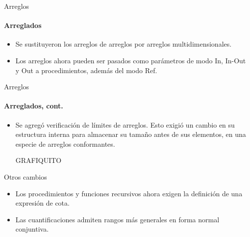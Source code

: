 \begin{frame}{Arreglos}
\framesubtitle{Arreglados}
\begin{itemize}
  \item Se sustituyeron los arreglos de arreglos por arreglos multidimensionales. \multidim{}

  \item Los arreglos ahora pueden ser pasados como parámetros de modo In, In-Out y Out a procedimientos, además del modo Ref. \inoutarr{}

\end{itemize}
\end{frame}
\begin{frame}{Arreglos}
\framesubtitle{Arreglados, cont.}
\begin{itemize}

  \item Se agregó verificación de límites de arreglos. \limits{} Esto exigió un
  cambio en su estructura interna para almacenar su tamaño antes de sus elementos, en una especie de arreglos conformantes.

  GRAFIQUITO

\end{itemize}
\end{frame}


\cnfquant{
\begin{lstlisting}[language=graciela, style=code, escapechar=\~]
(% ~\qop~ i : int | 0 < i /\ i < 100 /\ (p(i) \/ q(i)) | ... %)
(% ~\qop~ x : float | x ~\Elem~ xs | ... %)
\end{lstlisting}
}

\countquant{
\begin{lstlisting}[language=graciela, style=code, escapechar=\~]
(% # i : T | ... | ... %)
\end{lstlisting}
}


\begin{frame}{Otros cambios}
\begin{itemize}
  \item Los procedimientos y funciones recursivos ahora exigen la definición de una expresión de cota. \boundproc{}

  \item Las cuantificaciones admiten rangos más generales en forma normal conjuntiva. \cnfquant{}
\end{itemize}
\end{frame}

